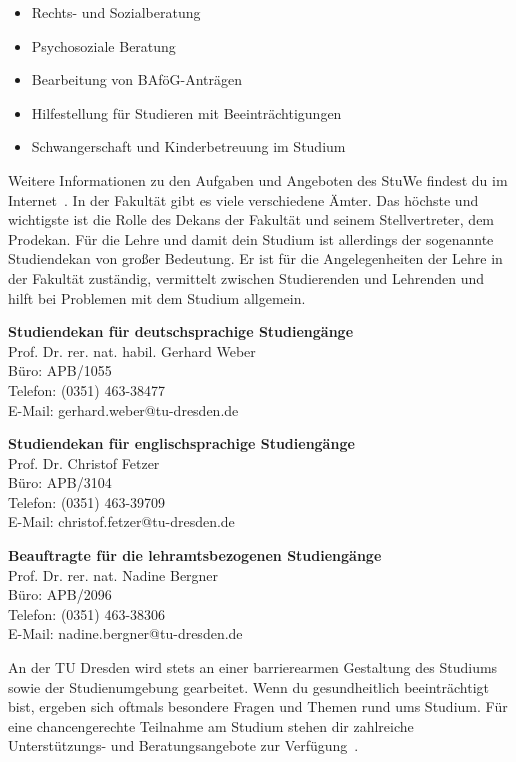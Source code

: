 \begin{itemize}
\item Rechts- und Sozialberatung
\item Psychosoziale Beratung
\item Bearbeitung von BAföG-Anträgen
\item Hilfestellung für Studieren mit Beeinträchtigungen
\item Schwangerschaft und Kinderbetreuung im Studium
\end{itemize}

Weitere Informationen zu den Aufgaben und Angeboten des StuWe findest du im Internet~.
In der Fakultät gibt es viele verschiedene Ämter.
Das höchste und wichtigste ist die Rolle des Dekans der Fakultät und seinem Stellvertreter, dem Prodekan.
Für die Lehre und damit dein Studium ist allerdings der sogenannte Studiendekan von großer Bedeutung.
Er ist für die Angelegenheiten der Lehre in der Fakultät zuständig, vermittelt zwischen Studierenden und Lehrenden und hilft bei Problemen mit dem Studium allgemein.

\pagebreak
\textbf{Studiendekan für deutschsprachige Studiengänge}\\
Prof. Dr. rer. nat. habil. Gerhard Weber \\
Büro: APB/1055 \\
Telefon: (0351) 463-38477 \\
E-Mail: gerhard.weber@tu-dresden.de

\textbf{Studiendekan für englischsprachige Studiengänge}\\
Prof. Dr. Christof Fetzer \\
Büro: APB/3104 \\
Telefon: (0351) 463-39709 \\
E-Mail: christof.fetzer@tu-dresden.de

\textbf{Beauftragte für die lehramtsbezogenen Studiengänge}\\
Prof. Dr. rer. nat. Nadine Bergner \\
Büro: APB/2096 \\
Telefon: (0351) 463-38306 \\
E-Mail: nadine.bergner@tu-dresden.de


An der TU Dresden wird stets an einer barrierearmen Gestaltung des Studiums sowie der Studienumgebung gearbeitet.
Wenn du gesundheitlich beeinträchtigt bist, ergeben sich oftmals besondere Fragen und Themen rund ums Studium.
Für eine chancengerechte Teilnahme am Studium stehen dir zahlreiche Unterstützungs- und Beratungsangebote zur Verfügung~.


